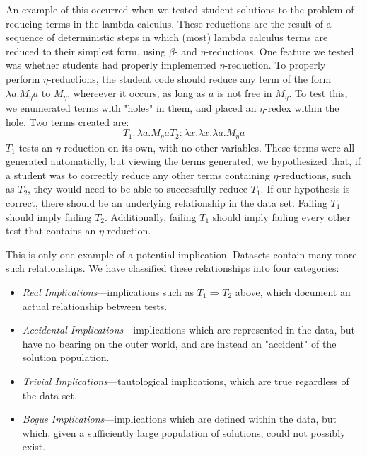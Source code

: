 \documentclass[11pt,twoside]{article}
\theoremstyle{definition}
\begin{document}
An example of this occurred when we tested student solutions to the problem of reducing terms in the lambda calculus. These reductions are the result of a sequence of deterministic steps in which (most) lambda calculus terms are reduced to their simplest form, using $\beta$- and $\eta$-reductions. One feature we tested was whether students had properly implemented $\eta$-reduction. To properly perform $\eta$-reductions, the student code should reduce any term of the form $\lambda a.M_\eta a$ to $M_\eta$, whereever it occurs, as long as $a$ is not free in $M_\eta$. To test this, we enumerated terms with "holes" in them, and placed an $\eta$-redex within the hole. Two terms created are: 
$$T_1 : \lambda a.M_\eta a
T_2 : \lambda x.\lambda x.\lambda a.M_\eta a$$
$T_1$ tests an $\eta$-reduction on its own, with no other variables. These terms were all generated automaticlly, but viewing the terms generated, we hypothesized that, if a student was to correctly reduce any other terms containing $\eta$-reductions, such as $T_2$, they would need to be able to successfully reduce $T_1$.
If our hypothesis is correct, there should be an underlying relationship in the data set. Failing $T_1$ should imply failing $T_2$. Additionally, failing $T_1$ should imply failing every other test that contains an $\eta$-reduction.

This is only one example of a potential implication. Datasets contain many more such relationships. We have classified these relationships into four categories:
\begin{itemize}
\item \emph{Real Implications}---implications such as $T_1 \Rightarrow T_2$ above, which document an actual relationship between tests. 
\item \emph{Accidental Implications}---implications which are represented in the data, but have no bearing on the outer world, and are instead an "accident" of the solution population. 
\item \emph{Trivial Implications}---tautological implications, which are true regardless of the data set. 
\item \emph{Bogus Implications}---implications which are defined within the data, but which, given a sufficiently large population of solutions, could not possibly exist.
\end{itemize}

\end{document}
